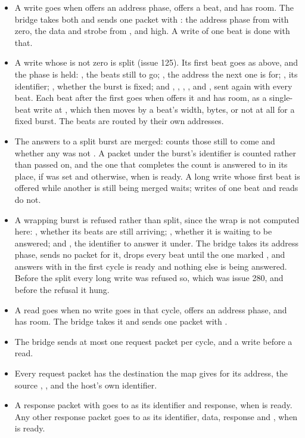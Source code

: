 \begin{itemize}
\item A write goes when  offers an address phase, 
offers a beat, and  has room. The bridge takes both and sends
one packet with  : the address phase from
 with  zero, the data and strobe from , and
 high. A write of one beat is done with that.
\item A write whose  is not zero is split (issue 125). Its
first beat goes as above, and the phase is held: , the
beats still to go; , the address the next one is for;
, its identifier; , whether the burst is fixed;
and , , , ,
 and , sent again with every beat. Each beat
after the first goes when  offers it and  has room,
as a single-beat write at , which then moves by a beat's
width,  bytes, or not at all for a fixed burst. The beats are
routed by their own addresses.
\item The answers to a split burst are merged:  counts
those still to come and  whether any was not . A
 packet under the burst's identifier is counted rather than
passed on, and the one that completes the count is answered to
 in its place,  if  was set and
 otherwise, when  is ready. A long write whose
first beat is offered while another is still being merged waits;
writes of one beat and reads do not.
\item A wrapping burst is refused rather than split, since the wrap is
not computed here: , whether its beats are still arriving;
, whether it is waiting to be answered; and , the
identifier to answer it under. The bridge takes its address phase,
sends no packet for it, drops every beat until the one marked
, and answers  with  in the first
cycle  is ready and nothing else is being answered. Before
the split every long write was refused so, which was issue 280, and
before the refusal it hung.
\item A read goes when no write goes in that cycle,  offers an
address phase, and  has room. The bridge takes it and sends
one packet with  .
\item The bridge sends at most one request packet per cycle, and a
write before a read.
\item Every request packet has the destination the map gives for its
address, the source , , and the host's own identifier.
\item A response packet with   goes to  as
its identifier and response, when  is ready. Any other response
packet goes to  as its identifier, data, response and
, when  is ready.
\end{itemize}

